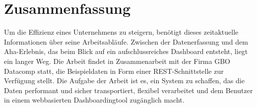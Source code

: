 \chapter*{Zusammenfassung}
\label{chap:zusammenfassung}

Um die Effizienz eines Unternehmens zu steigern, benötigt dieses zeitaktuelle Informationen über seine Arbeitsabläufe.
Zwischen der Datenerfassung und dem Aha-Erlebnis, das beim Blick auf ein aufschlussreiches Dashboard entsteht, liegt ein
langer Weg. Die Arbeit findet in Zusammenarbeit mit der Firma GBO Datacomp statt, die Beispieldaten
in Form einer REST-Schnittstelle zur Verfügung stellt. Die Aufgabe der Arbeit ist es, ein System zu schaffen,
das die Daten performant und sicher transportiert, flexibel verarbeitet und dem Benutzer
in einem webbasierten Dashboardingtool zugänglich macht.

